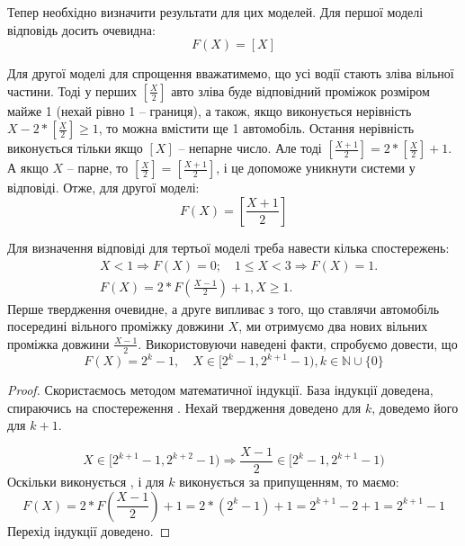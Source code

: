 Тепер необхідно визначити результати для цих моделей. Для першої моделі відповідь досить очевидна:
\begin{equation}
	\label{eq:upperbound}
	F(X)=[X]
\end{equation}

Для другої моделі для спрощення вважатимемо, що усі водії стають зліва вільної частини. Тоді у перших $[\frac X2]$ авто зліва буде відповідний проміжок розміром майже 1 (нехай рівно 1 – границя), а також, якщо виконується нерівність $X - 2 * [\frac X2] \geq 1$, то можна вмістити ще 1 автомобіль. Остання нерівність виконується тільки якщо $[X]$ – непарне число. Але тоді $[\frac{X+1}{2}] = 2 * [\frac{X}{2}] + 1$. А якщо $X$ – парне, то $[\frac{X}{2}] = [\frac{X+1}{2}]$, і це допоможе уникнути системи у відповіді. Отже, для другої моделі:
\begin{equation}
	\label{eq:lowerbound}
	F(X)=\left[\frac{X+1}{2}\right]
\end{equation}

Для визначення відповіді для тертьої моделі треба навести кілька спостережень:
\begin{align}
	&X < 1 \Rightarrow F(X)=0;\quad 1 \leq X < 3 \Rightarrow F(X) = 1.\label{eq:part_case_prop1}\\
	&F(X) = 2 * F\left(\frac{X-1}{2}\right) + 1, X \geq 1.\label{eq:part_case_prop2}
\end{align}
Перше твердження очевидне, а друге випливає з того, що ставлячи автомобіль посередині вільного проміжку довжини $X$, ми отримуємо два
нових вільних проміжка довжини $\frac{X-1}{2}$. Використовуючи наведені факти,
спробуємо довести, що
\begin{equation}
	F(X) = 2^k - 1,\quad X \in [2^k - 1, 2^{k+1} - 1), k \in \mathbb{N} \cup \{0\} \label{eq:part_case_res3}
\end{equation}
\begin{proof}
	Скористаємось методом математичної індукції. База індукції доведена, спираючись на спостереження . Нехай твердження доведено для $k$, доведемо його для $k+1$.
	
	\begin{equation}
		X \in [2^{k+1} - 1, 2^{k+2} - 1) \Rightarrow \frac{X-1}{2} \in [2^k - 1, 2^{k+1} - 1)
	\end{equation}
	Оскільки виконується , і для $k$ виконується  за припущенням, то маємо:
	\begin{equation}
		F(X) = 2 * F\left(\frac{X-1}{2}\right) + 1 = 2 * (2^k - 1) + 1 = 2^{k+1} - 2 + 1 = 2^{k+1} - 1
	\end{equation}
	Перехід індукції доведено.
\end{proof}